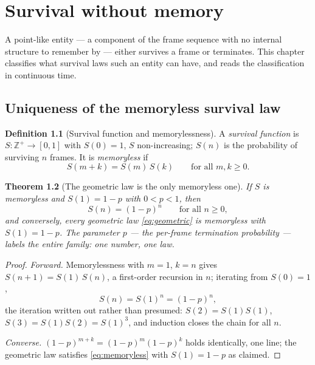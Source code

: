 \documentclass[11pt]{amsbook}
\theoremstyle{plain}
\newtheorem{theorem}{Theorem}[chapter]
\theoremstyle{definition}
\newtheorem{definition}[theorem]{Definition}
\theoremstyle{remark}
\newcommand{\uses}[1]{\par\nopagebreak\noindent{\footnotesize\emph{Uses: #1.}\par}}
\begin{document}
\chapter{Survival without memory}\label{ch:decay}

A point-like entity --- a component of the frame sequence with no internal structure to remember by --- either survives a frame or terminates. This chapter classifies what survival laws such an entity can have, and reads the classification in continuous time.

\section{Uniqueness of the memoryless survival law}\label{sec:survival}

\begin{definition}[Survival function and memorylessness]\label{def:survival}
A \emph{survival function} is $S: \mathbb{Z}^{+} \to [0,1]$ with $S(0) = 1$, $S$ non-increasing; $S(n)$ is the probability of surviving $n$ frames. It is \emph{memoryless} if
\begin{equation}\label{eq:memoryless}
S(m + k) = S(m)\,S(k) \qquad \text{for all } m, k \geq 0.
\end{equation}
\end{definition}

\begin{theorem}[The geometric law is the only memoryless one]\label{thm:geometric}
If $S$ is memoryless and $S(1) = 1 - p$ with $0 < p < 1$, then
\begin{equation}\label{eq:geometric}
S(n) = (1-p)^{n} \qquad \text{for all } n \geq 0,
\end{equation}
and conversely, every geometric law \cref{eq:geometric} is memoryless with $S(1) = 1-p$. The parameter $p$ --- the per-frame termination probability --- labels the entire family: one number, one law.
\uses{\cref{eq:memoryless}; induction}
\end{theorem}

\begin{proof}
\emph{Forward.} Memorylessness with $m = 1$, $k = n$ gives $S(n+1) = S(1)\,S(n)$, a first-order recursion in $n$; iterating from $S(0) = 1$,
\begin{equation}\label{eq:iterate}
S(n) = S(1)^{n} = (1-p)^{n},
\end{equation}
the iteration written out rather than presumed: $S(2) = S(1)S(1)$, $S(3) = S(1)S(2) = S(1)^{3}$, and induction closes the chain for all $n$.

\emph{Converse.} $(1-p)^{m+k} = (1-p)^{m}(1-p)^{k}$ holds identically, one line; the geometric law satisfies \cref{eq:memoryless} with $S(1) = 1 - p$ as claimed.
\end{proof}
\end{document}
